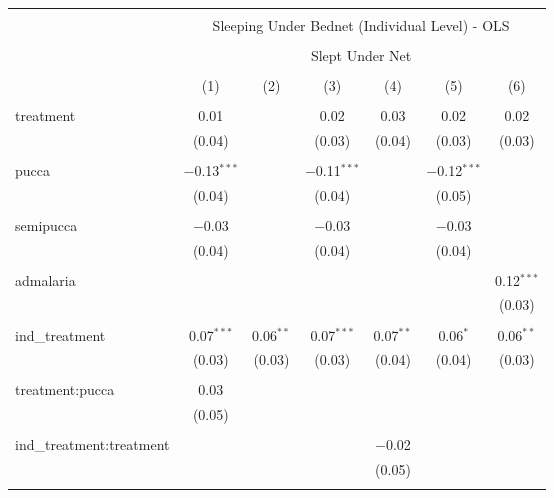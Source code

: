
\begin{table}[!htbp] \centering 
  \caption{} 
  \label{tbl:Sleeping Under Bednet (Individual Level) - OLS} 
\begin{tabular}{@{\extracolsep{5pt}}lcccccc} 
\\[-1.8ex]\hline 
\hline \\[-1.8ex] 
 & \multicolumn{6}{c}{Sleeping Under Bednet (Individual Level) - OLS} \\ 
\cline{2-7} 
\\[-1.8ex] & \multicolumn{6}{c}{Slept Under Net} \\ 
\\[-1.8ex] & (1) & (2) & (3) & (4) & (5) & (6)\\ 
\hline \\[-1.8ex] 
 treatment & 0.01 &  & 0.02 & 0.03 & 0.02 & 0.02 \\ 
  & (0.04) &  & (0.03) & (0.04) & (0.03) & (0.03) \\ 
  & & & & & & \\ 
 pucca & $-$0.13$^{***}$ &  & $-$0.11$^{***}$ &  & $-$0.12$^{***}$ &  \\ 
  & (0.04) &  & (0.04) &  & (0.05) &  \\ 
  & & & & & & \\ 
 semipucca & $-$0.03 &  & $-$0.03 &  & $-$0.03 &  \\ 
  & (0.04) &  & (0.04) &  & (0.04) &  \\ 
  & & & & & & \\ 
 admalaria &  &  &  &  &  & 0.12$^{***}$ \\ 
  &  &  &  &  &  & (0.03) \\ 
  & & & & & & \\ 
 ind\_treatment & 0.07$^{***}$ & 0.06$^{**}$ & 0.07$^{***}$ & 0.07$^{**}$ & 0.06$^{*}$ & 0.06$^{**}$ \\ 
  & (0.03) & (0.03) & (0.03) & (0.04) & (0.04) & (0.03) \\ 
  & & & & & & \\ 
 treatment:pucca & 0.03 &  &  &  &  &  \\ 
  & (0.05) &  &  &  &  &  \\ 
  & & & & & & \\ 
 ind\_treatment:treatment &  &  &  & $-$0.02 &  &  \\ 
  &  &  &  & (0.05) &  &  \\ 
  & & & & & & \\ 

\end{tabular}
\end{table}
